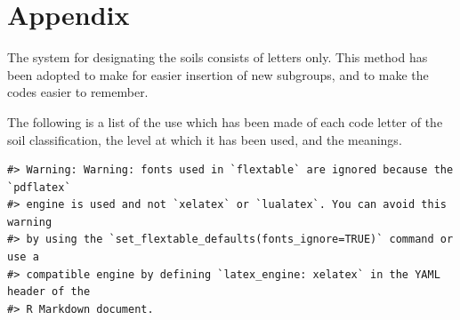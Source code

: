 \documentclass[
  letterpaper,
  DIV=11,
  numbers=noendperiod]{scrreprt}
\begin{document}

\hypertarget{sec-appendix}{%
\chapter{Appendix}\label{sec-appendix}}

The system for designating the soils consists of letters only. This
method has been adopted to make for easier insertion of new subgroups,
and to make the codes easier to remember.

The following is a list of the use which has been made of each code
letter of the soil classification, the level at which it has been used,
and the meanings.

\begin{verbatim}
#> Warning: Warning: fonts used in `flextable` are ignored because the `pdflatex`
#> engine is used and not `xelatex` or `lualatex`. You can avoid this warning
#> by using the `set_flextable_defaults(fonts_ignore=TRUE)` command or use a
#> compatible engine by defining `latex_engine: xelatex` in the YAML header of the
#> R Markdown document.
\end{verbatim}

\providecommand{\docline}[3]{\noalign{\global\setlength{\arrayrulewidth}{#1}}\arrayrulecolor[HTML]{#2}\cline{#3}}

\setlength{\tabcolsep}{2pt}

\renewcommand*{\arraystretch}{1.5}
\end{document}
